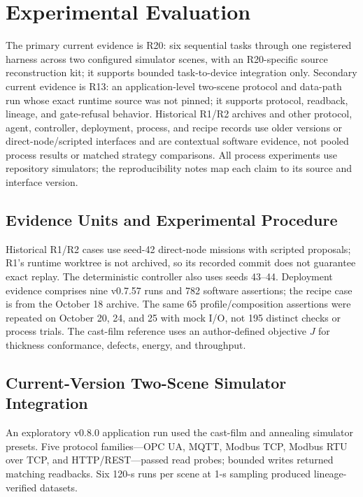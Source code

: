 \section{Experimental Evaluation}
\label{sec:eval}
The primary current evidence is R20: six sequential tasks through one
registered harness across two configured simulator scenes, with an
R20-specific source reconstruction kit; it supports bounded task-to-device
integration only. Secondary current evidence is R13: an application-level
two-scene protocol and data-path run whose exact runtime source was not pinned;
it supports protocol, readback, lineage, and gate-refusal behavior. Historical
R1/R2 archives and other protocol, agent, controller, deployment, process,
and recipe records use older versions or direct-node/scripted interfaces and
are contextual software evidence, not pooled process results or matched
strategy comparisons. All process experiments use repository simulators; the
reproducibility notes map each claim to its source and interface version.

\subsection{Evidence Units and Experimental Procedure}
\label{sec:testbed}
\label{sec:procedure}
Historical R1/R2 cases use seed-42 direct-node missions with scripted
proposals; R1's runtime worktree is not archived, so its recorded commit does
not guarantee exact replay. The deterministic controller also uses seeds
43--44. Deployment evidence comprises nine v0.7.57 runs and 782 software
assertions; the recipe case is from the October 18 archive. The same 65
profile/composition assertions were repeated on October 20, 24, and 25 with
mock I/O, not 195 distinct checks or process trials. The cast-film reference
uses an author-defined objective $J$ for thickness conformance, defects,
energy, and throughput.

\subsection{Current-Version Two-Scene Simulator Integration}
\label{sec:crossscene}
An exploratory v0.8.0 application run used the cast-film and annealing
simulator presets. Five protocol families---OPC UA, MQTT, Modbus TCP, Modbus
RTU over TCP, and HTTP/REST---passed read probes; bounded writes returned
matching readbacks. Six 120-s runs per scene at 1-s sampling produced
lineage-verified datasets.

